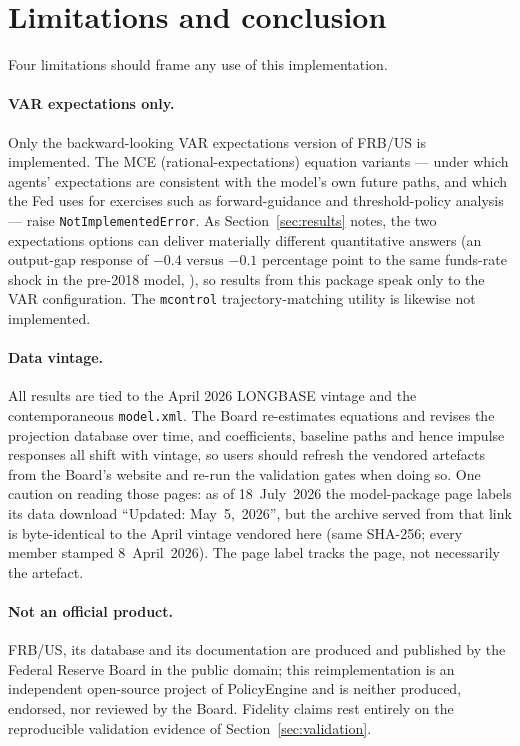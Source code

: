 \section{Limitations and conclusion}
\label{sec:limitations}

Four limitations should frame any use of this implementation.

\paragraph{VAR expectations only.} Only the backward-looking VAR expectations version of FRB/US is implemented. The MCE (rational-expectations) equation variants --- under which agents' expectations are consistent with the model's own future paths, and which the Fed uses for exercises such as forward-guidance and threshold-policy analysis --- raise \texttt{NotImplementedError}. As Section~\ref{sec:results} notes, the two expectations options can deliver materially different quantitative answers (an output-gap response of $-0.4$ versus $-0.1$ percentage point to the same funds-rate shock in the pre-2018 model, \citealp{brayton2014note}), so results from this package speak only to the VAR configuration. The \texttt{mcontrol} trajectory-matching utility is likewise not implemented.

\paragraph{Data vintage.} All results are tied to the April 2026 LONGBASE vintage and the contemporaneous \texttt{model.xml}. The Board re-estimates equations and revises the projection database over time, and coefficients, baseline paths and hence impulse responses all shift with vintage, so users should refresh the vendored artefacts from the Board's website \citep{fedfrbuspython} and re-run the validation gates when doing so. One caution on reading those pages: as of 18~July~2026 the model-package page labels its data download ``Updated: May~5,~2026'', but the archive served from that link is byte-identical to the April vintage vendored here (same SHA-256; every member stamped 8~April~2026). The page label tracks the page, not necessarily the artefact.

\paragraph{Not an official product.} FRB/US, its database and its documentation are produced and published by the Federal Reserve Board in the public domain; this reimplementation is an independent open-source project of PolicyEngine and is neither produced, endorsed, nor reviewed by the Board. Fidelity claims rest entirely on the reproducible validation evidence of Section~\ref{sec:validation}.


